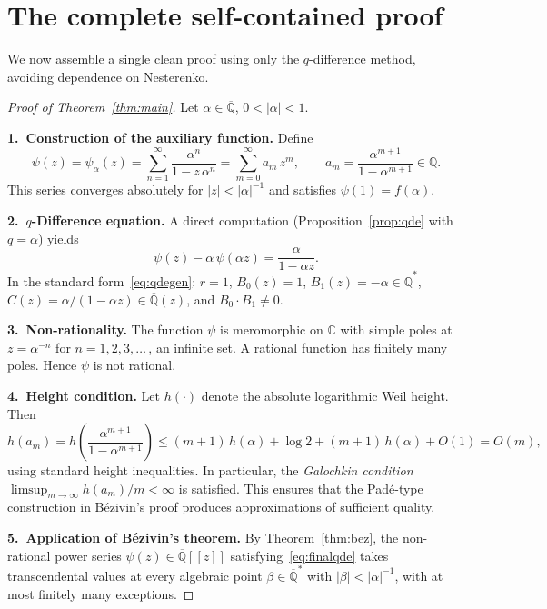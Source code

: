 \documentclass[12pt]{amsart}
\theoremstyle{definition}
\theoremstyle{remark}
\begin{document}
\section{The complete self-contained proof}\label{sec:clean}

We now assemble a single clean proof using only the $q$-difference
method, avoiding dependence on Nesterenko.

\begin{proof}[Proof of Theorem~\ref{thm:main}]
Let $\alpha\in\overline{\mathbb{Q}}$, $0<|\alpha|<1$.

\medskip
\noindent\textbf{1.\ Construction of the auxiliary function.}
Define
\[
  \psi(z) = \psi_\alpha(z)
  = \sum_{n=1}^{\infty}\frac{\alpha^n}{1-z\,\alpha^n}
  = \sum_{m=0}^{\infty} a_m\, z^m, \qquad
  a_m = \frac{\alpha^{m+1}}{1-\alpha^{m+1}} \in\overline{\mathbb{Q}}.
\]
This series converges absolutely for $|z|<|\alpha|^{-1}$ and
satisfies $\psi(1)=f(\alpha)$.

\medskip
\noindent\textbf{2.\ $q$-Difference equation.}
A direct computation (Proposition~\ref{prop:qde} with $q=\alpha$) yields
\begin{equation}\label{eq:finalqde}
  \psi(z) - \alpha\,\psi(\alpha z) = \frac{\alpha}{1-\alpha z}.
\end{equation}
In the standard form~\eqref{eq:qdegen}: $r=1$, $B_0(z)=1$,
$B_1(z)=-\alpha\in\overline{\mathbb{Q}}^*$,
$C(z)=\alpha/(1-\alpha z)\in\overline{\mathbb{Q}}(z)$, and
$B_0\cdot B_1\neq 0$.

\medskip
\noindent\textbf{3.\ Non-rationality.}
The function $\psi$ is meromorphic on $\mathbb{C}$ with simple poles
at $z=\alpha^{-n}$ for $n=1,2,3,\ldots\,$, an infinite set. A
rational function has finitely many poles. Hence $\psi$ is not
rational.

\medskip
\noindent\textbf{4.\ Height condition.}
Let $h(\cdot)$ denote the absolute logarithmic Weil height. Then
\[
  h(a_m) = h\!\left(\frac{\alpha^{m+1}}{1-\alpha^{m+1}}\right)
  \le (m+1)\,h(\alpha) + \log 2 + (m+1)\,h(\alpha) + O(1)
  = O(m),
\]
using standard height inequalities. In particular, the
\emph{Galochkin condition}
$\limsup_{m\to\infty}h(a_m)/m < \infty$
is satisfied. This ensures that the Pad\'e-type construction in
B\'ezivin's proof produces approximations of sufficient quality.

\medskip
\noindent\textbf{5.\ Application of B\'ezivin's theorem.}
By Theorem~\ref{thm:bez}, the non-rational power series
$\psi(z)\in\overline{\mathbb{Q}}[[z]]$ satisfying~\eqref{eq:finalqde}
takes transcendental values at every algebraic point
$\beta\in\overline{\mathbb{Q}}^*$ with $|\beta|<|\alpha|^{-1}$,
with at most finitely many exceptions.


\end{proof}
\end{document}
